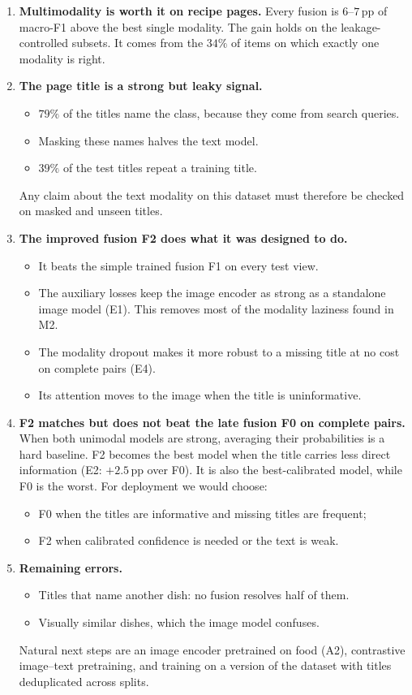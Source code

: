 \begin{enumerate}
  \item \textbf{Multimodality is worth it on recipe pages.} Every fusion is $6$--$7$\,pp of macro-F1 above the best
        single modality. The gain holds on the leakage-controlled subsets. It comes from the $34\%$ of items on which
        exactly one modality is right.
  \item \textbf{The page title is a strong but leaky signal.}
        \begin{itemize}
          \item $79\%$ of the titles name the class, because they come from search queries.
          \item Masking these names halves the text model.
          \item $39\%$ of the test titles repeat a training title.
        \end{itemize}
        Any claim about the text modality on this dataset must therefore be checked on masked and unseen titles.
  \item \textbf{The improved fusion F2 does what it was designed to do.}
        \begin{itemize}
          \item It beats the simple trained fusion F1 on every test view.
          \item The auxiliary losses keep the image encoder as strong as a standalone image model (E1). This
                removes most of the modality laziness found in M2.
          \item The modality dropout makes it more robust to a missing title at no cost on complete pairs (E4).
          \item Its attention moves to the image when the title is uninformative.
        \end{itemize}
  \item \textbf{F2 matches but does not beat the late fusion F0 on complete pairs.} When both unimodal models are
        strong, averaging their probabilities is a hard baseline. F2 becomes the best model when the title carries
        less direct information (E2: $+2.5$\,pp over F0). It is also the best-calibrated model, while F0 is the worst.
        For deployment we would choose:
        \begin{itemize}
          \item F0 when the titles are informative and missing titles are frequent;
          \item F2 when calibrated confidence is needed or the text is weak.
        \end{itemize}
  \item \textbf{Remaining errors.}
        \begin{itemize}
          \item Titles that name another dish: no fusion resolves half of them.
          \item Visually similar dishes, which the image model confuses.
        \end{itemize}
        Natural next steps are an image encoder pretrained on food (A2), contrastive image--text pretraining, and
        training on a version of the dataset with titles deduplicated across splits.
\end{enumerate}
